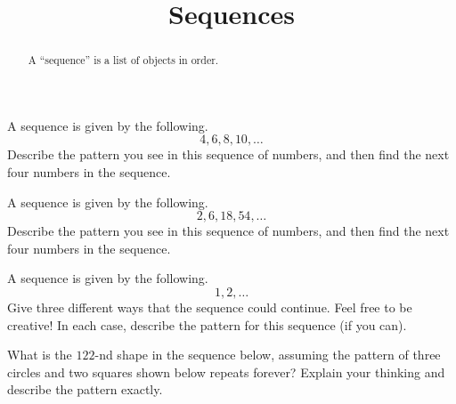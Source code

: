 \documentclass{ximera}
\title{Sequences}
\begin{document}
\begin{abstract} A ``sequence'' is a list of objects in order. \end{abstract}
\maketitle

\begin{problem}
A sequence is given by the following.
\[
4, 6, 8, 10, \dots
\]
Describe the pattern you see in this sequence of numbers, and then find the next four numbers in the sequence.
\end{problem} \vfill

\begin{problem}
A sequence is given by the following.
\[
2, 6, 18, 54, \dots
\]
Describe the pattern you see in this sequence of numbers, and then find the next four numbers in the sequence.
\end{problem} \vfill

\begin{problem}
A sequence is given by the following.
\[
1, 2, \dots
\]
Give three different ways that the sequence could continue. Feel free to be creative! In each case, describe the pattern for this sequence (if you can).
\end{problem} \vfill


\begin{problem}
What is the $122$-nd shape in the sequence below, assuming the pattern of three circles and two squares shown below repeats forever? Explain your thinking and describe the pattern exactly.
\begin{center}
\end{center}
\end{problem} \vfill


\newpage
\end{document}
